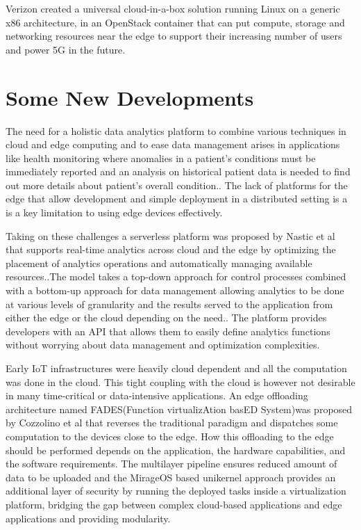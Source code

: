 \documentclass[sigconf]{acmart}
\begin{document}
Verizon created a universal cloud-in-a-box solution running Linux on a generic x86 architecture, in an OpenStack container that can put compute, storage and networking resources near the edge to support their increasing number of users and power 5G in the future.\cite{open_stack_living_on_edge}\cite{open_stack_verizon}

\section{Some New Developments}
The need for a holistic data analytics platform to combine various techniques in cloud and edge computing and to ease data management arises in applications like health monitoring where anomalies in a patient's conditions must be immediately reported and an analysis on historical patient data is needed to find out more details about patient's overall condition.\cite{ieee-serverless-platform-edge}. The lack of platforms for the edge that allow development and simple deployment in a distributed setting is a is a key limitation to using edge devices effectively\cite{ieee_iot_cloud_analytics_newsletter}.

Taking on these challenges a serverless platform was proposed by Nastic et al that supports real-time analytics across cloud and the edge by optimizing the placement of analytics operations and automatically managing available resources.\cite{ieee-serverless-platform-edge}.The model takes a top-down approach for control processes combined with a bottom-up approach for data management allowing analytics to be done at various levels of granularity and the results served to the application from either the edge or the cloud depending on the need.\cite{ieee-serverless-platform-edge}. The platform provides developers with an API that allows them to easily define analytics functions without worrying about data management and optimization complexities. 

Early IoT infrastructures were heavily cloud dependent and all the computation was done in the cloud. This tight coupling with the cloud is however not  desirable in many time-critical or data-intensive applications.\cite{FADES-offloading} An edge offloading architecture named FADES(Function virtualizAtion basED System)was proposed by Cozzolino et al that reverses the traditional paradigm and dispatches some computation to the devices close to the edge. How this offloading to the edge should be performed depends on the application, the hardware capabilities, and the software requirements. \cite{FADES-offloading} The multilayer pipeline ensures reduced amount of data to be uploaded and the MirageOS based unikernel approach provides an additional layer of security by running the deployed tasks inside a virtualization platform, bridging the gap between complex cloud-based applications and edge applications and providing modularity.\cite{FADES-offloading}
\end{document}
